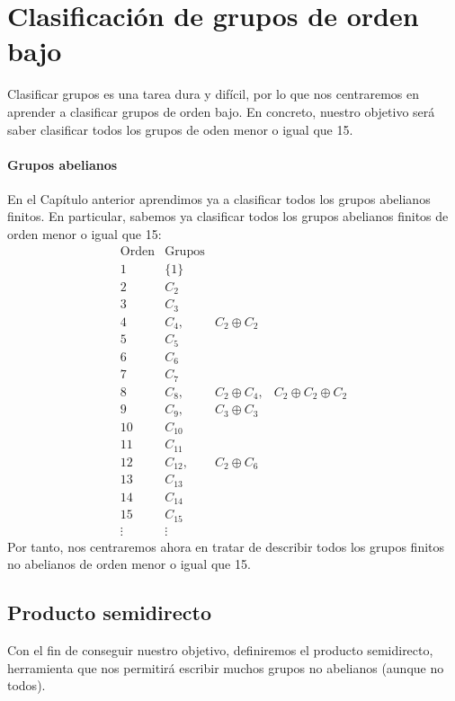 \chapter{Clasificación de grupos de orden bajo}
\noindent
Clasificar grupos es una tarea dura y difícil, por lo que nos centraremos en aprender a clasificar grupos de orden bajo. En concreto, nuestro objetivo será saber clasificar todos los grupos de oden menor o igual que 15.

\subsubsection{Grupos abelianos}
\noindent
En el Capítulo anterior aprendimos ya a clasificar todos los grupos abelianos finitos. En particular, sabemos ya clasificar todos los grupos abelianos finitos de orden menor o igual que 15:
\begin{equation*}
    \begin{array}{c|ccc}
        \text{Orden}  & \text{Grupos} & &  \\
        \hline
        1 & \{1\} &  &\\
        2 & C_2 & & \\
        3 & C_3 & & \\
        4 & C_4, &  C_2\oplus C_2& \\
        5 & C_5 & & \\
        6 & C_6 & & \\
        7 & C_7 & & \\
        8 & C_8, &  C_2\oplus C_4,  & C_2\oplus C_2 \oplus C_2\\
        9 & C_9, &  C_3\oplus C_3 & \\
        10 & C_{10} & & \\
        11 & C_{11} & & \\
        12 & C_{12}, &  C_2\oplus C_6 & \\
        13 & C_{13} & & \\
        14 & C_{14} & & \\
        15 & C_{15} & & \\
        \vdots & \vdots 
    \end{array}
\end{equation*}
\noindent
Por tanto, nos centraremos ahora en tratar de describir todos los grupos finitos no abelianos de orden menor o igual que 15.

\section{Producto semidirecto}
\noindent
Con el fin de conseguir nuestro objetivo, definiremos el producto semidirecto, herramienta que nos permitirá escribir muchos grupos no abelianos (aunque no todos).

